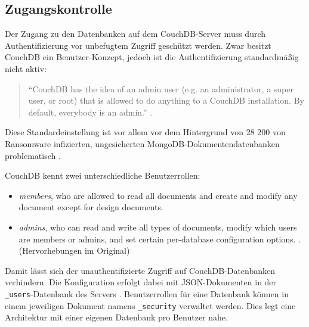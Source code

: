 \subsection{Zugangskontrolle}

Der Zugang zu den Datenbanken auf dem CouchDB-Server muss durch Authentifizierung vor unbefugtem Zugriff geschützt werden. Zwar besitzt CouchDB ein Benutzer-Konzept, jedoch ist die Authentifizierung standardmäßig nicht aktiv:

\begin{citeenv}
	\begin{quotation}
		"`CouchDB has the idea of an admin user (e.g. an administrator, a super user, or root) that is allowed to do anything to a CouchDB installation. By default, everybody is an admin."' \cite{couch:security}.
	\end{quotation}
\end{citeenv}

Diese Standardeinstellung ist vor allem vor dem Hintergrund von 28 200 von Ransomware infizierten, ungesicherten MongoDB-Dokumentendatenbanken problematisch \cite{bleepingcomputer:mongodb:security}.

CouchDB kennt zwei unterschiedliche Benutzerrollen:

\begin{citeenv}
	\begin{itemize}
		\item \textit{members}, who are allowed to read all documents and create and modify any document except for design documents.
		\item \textit{admins}, who can read and write all types of documents, modify which users are members or admins, and set certain per-database configuration options.  \cite{couch:security}. (Hervorhebungen im Original)
	\end{itemize}
\end{citeenv}

Damit lässt sich der unauthentifizierte Zugriff auf CouchDB-Datenbanken verhindern. Die Konfiguration erfolgt dabei mit JSON-Dokumenten in der \texttt{\_users}-Datenbank des Servers \cite{couch:security}. Benutzerrollen für eine Datenbank können in einem jeweiligen Dokument namens \texttt{\_security} verwaltet werden. Dies legt eine Architektur mit einer eigenen Datenbank pro Benutzer nahe.